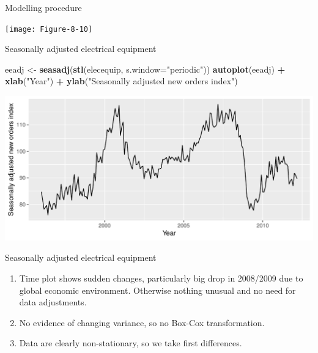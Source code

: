 \documentclass[14pt,ignorenonframetext,]{beamer}
\newenvironment{Shaded}{\begin{snugshade}}{\end{snugshade}}
\newcommand{\KeywordTok}[1]{\textcolor[rgb]{0.13,0.29,0.53}{\textbf{#1}}}
\newcommand{\DataTypeTok}[1]{\textcolor[rgb]{0.13,0.29,0.53}{#1}}
\newcommand{\StringTok}[1]{\textcolor[rgb]{0.31,0.60,0.02}{#1}}
\newcommand{\OperatorTok}[1]{\textcolor[rgb]{0.81,0.36,0.00}{\textbf{#1}}}
\newcommand{\NormalTok}[1]{#1}
\providecommand{\tightlist}{%
  \setlength{\itemsep}{0pt}\setlength{\parskip}{0pt}}
\begin{document}
\begin{frame}{Modelling procedure}

\centerline{\texttt{[image: Figure-8-10]}}

\end{frame}

\begin{frame}[fragile]{\large Seasonally adjusted electrical equipment}

\fontsize{11.5}{15}\sf

\begin{Shaded}
\begin{Highlighting}[]
\NormalTok{eeadj <-}\StringTok{ }\KeywordTok{seasadj}\NormalTok{(}\KeywordTok{stl}\NormalTok{(elecequip, }\DataTypeTok{s.window=}\StringTok{"periodic"}\NormalTok{))}
\KeywordTok{autoplot}\NormalTok{(eeadj) }\OperatorTok{+}\StringTok{ }\KeywordTok{xlab}\NormalTok{(}\StringTok{"Year"}\NormalTok{) }\OperatorTok{+}
\StringTok{  }\KeywordTok{ylab}\NormalTok{(}\StringTok{"Seasonally adjusted new orders index"}\NormalTok{)}
\end{Highlighting}
\end{Shaded}

\includegraphics{week_5_arima_files/figure-beamer/ee1-1.pdf}

\end{frame}

\begin{frame}{\large Seasonally adjusted electrical equipment}

\begin{enumerate}
\def\labelenumi{\arabic{enumi}.}
\tightlist
\item
  Time plot shows sudden changes, particularly big drop in 2008/2009 due
  to global economic environment. Otherwise nothing unusual and no need
  for data adjustments.
\item
  No evidence of changing variance, so no Box-Cox transformation.
\item
  Data are clearly non-stationary, so we take first differences.
\end{enumerate}

\end{frame}
\end{document}
